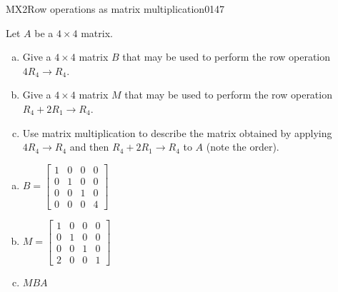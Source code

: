 \begin{exercise}{MX2}{Row operations as matrix multiplication}{0147} 
\begin{exerciseStatement} 

Let \(A\) be a \(4 \times 4\) matrix.

 

\begin{enumerate}[(a)]
\item Give a \(4 \times 4\) matrix \(B\) that may be used to perform the row operation \(4 R_4 \to R_4\).
\item Give a \(4 \times 4\) matrix \(M\) that may be used to perform the row operation \(R_4 + 2 R_1 \to R_4\).
\item Use matrix multiplication to describe the matrix obtained by applying \(4 R_4 \to R_4\) and then \(R_4 + 2 R_1 \to R_4\) to \(A\) (note the order). 
\end{enumerate}

     \end{exerciseStatement}
 \begin{exerciseAnswer} 

\begin{enumerate}[(a)]
\item \(B=\left[\begin{array}{cccc}
1 & 0 & 0 & 0 \\
0 & 1 & 0 & 0 \\
0 & 0 & 1 & 0 \\
0 & 0 & 0 & 4
\end{array}\right]\)
\item \(M=\left[\begin{array}{cccc}
1 & 0 & 0 & 0 \\
0 & 1 & 0 & 0 \\
0 & 0 & 1 & 0 \\
2 & 0 & 0 & 1
\end{array}\right]\)
\item  \(MBA\) 
\end{enumerate}

     \end{exerciseAnswer}
 \end{exercise}


\newpage




